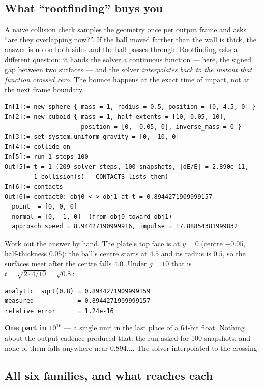 \documentclass[11pt]{article}
\begin{document}
\subsection{What ``rootfinding'' buys you}

A naive collision check samples the geometry once per output frame and
asks ``are they overlapping now?''. If the ball moved farther than the
wall is thick, the answer is no on both sides and the ball passes
through. Rootfinding asks a different question: it hands the solver a
continuous function --- here, the signed gap between two surfaces ---
and the solver \emph{interpolates back to the instant that function
crossed zero}. The bounce happens at the exact time of impact, not at
the next frame boundary.

\begin{lstlisting}
In[1]:= new sphere { mass = 1, radius = 0.5, position = [0, 4.5, 0] }
In[2]:= new cuboid { mass = 1, half_extents = [10, 0.05, 10],
                     position = [0, -0.05, 0], inverse_mass = 0 }
In[3]:= set system.uniform_gravity = [0, -10, 0]
In[4]:= collide on
In[5]:= run 1 steps 100
Out[5]= t = 1 (209 solver steps, 100 snapshots, |dE/E| = 2.890e-11,
        1 collision(s) - CONTACTS lists them)
In[6]:= contacts
Out[6]= contact0: obj0 <-> obj1 at t = 0.8944271909999157
  point  = [0, 0, 0]
  normal = [0, -1, 0]  (from obj0 toward obj1)
  approach speed = 8.94427190999916, impulse = 17.88854381999832
\end{lstlisting}

Work out the answer by hand. The plate's top face is at $y=0$ (centre
$-0.05$, half-thickness $0.05$); the ball's centre starts at $4.5$ and
its radius is $0.5$, so the surfaces meet after the centre falls $4.0$.
Under $g=10$ that is $t=\sqrt{2\cdot 4/10}=\sqrt{0.8}$:

\begin{lstlisting}
analytic  sqrt(0.8) = 0.8944271909999159
measured            = 0.8944271909999157
relative error      = 1.24e-16
\end{lstlisting}

\textbf{One part in $10^{16}$} --- a single unit in the last place of a
64-bit float. Nothing about the output cadence produced that: the run
asked for 100 snapshots, and none of them falls anywhere near
$0.894\ldots$. The solver interpolated to the crossing.

\subsection{All six families, and what reaches each}
\end{document}
